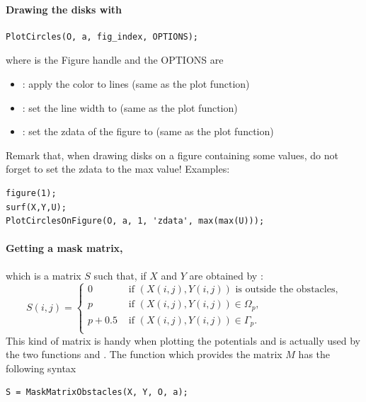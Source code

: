 \paragraph{Drawing the disks with \PlotCircles}\mbox{}
\begin{lstlisting}
PlotCircles(O, a, fig_index, OPTIONS);
\end{lstlisting}
where  is the Figure handle and the OPTIONS are
\begin{itemize}
\item {}: apply the  color to lines (same as the plot function)
\item {}: set the line width to  (same as the plot function)
\item {}: set the zdata of the figure to  (same as the plot function)
\end{itemize}
Remark that, when drawing disks on a figure containing some values, do not forget to set the zdata to the max value! Examples: 
\begin{lstlisting}
figure(1);
surf(X,Y,U);
PlotCirclesOnFigure(O, a, 1, 'zdata', max(max(U)));
\end{lstlisting}

\paragraph{Getting a mask matrix,} which is a matrix $S$ such that, if $X$ and $Y$ are obtained by :
$$
S(i,j) = \begin{cases}
0 & \text{ if } (X(i,j),Y(i,j)) \text{ is outside the obstacles,}\\
p & \text{ if } (X(i,j),Y(i,j)) \in\Omega_p,\\
p+0.5 & \text{ if } (X(i,j),Y(i,j)) \in\Gamma_p.\\
\end{cases}
$$
This kind of matrix is handy when plotting the potentials and is actually used by the two functions \ExternalPotential and \InternalPotential. The function \MaskMatrixObstacles which provides the matrix $M$ has the following syntax
\begin{lstlisting}
S = MaskMatrixObstacles(X, Y, O, a);
\end{lstlisting}

